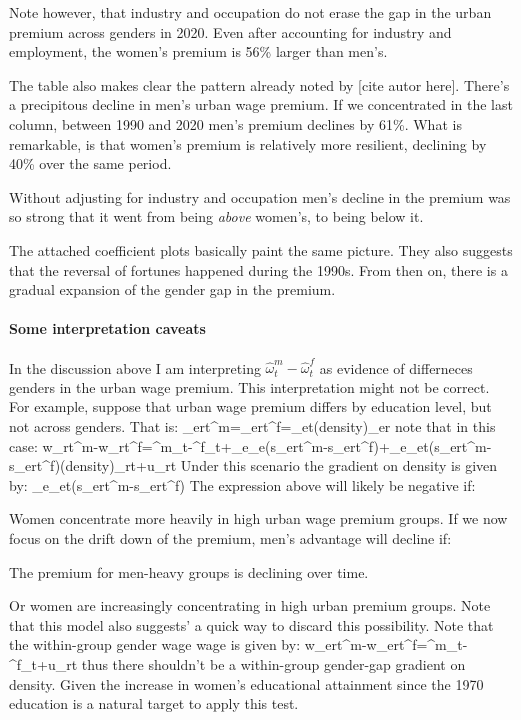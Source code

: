 	\item Note however, that industry and occupation do not erase the gap in the urban premium across genders in 2020. Even after accounting for industry and employment, the women's premium is 56\% larger than men's.
	\item The table also makes clear the pattern already noted by [cite autor here]. There's a precipitous decline in men's urban wage premium. If we concentrated in the last column, between 1990 and 2020 men's premium declines by 61\%. What is remarkable, is that women's premium is relatively more resilient, declining by 40\% over the same period.
	\item Without adjusting for industry and occupation men's decline in the premium was so strong that it went from being \textit{above} women's, to being below it.
\eitem 

The attached coefficient plots basically paint the same picture. They also suggests that the reversal of fortunes happened during the 1990s. From then on, there is a gradual expansion of the gender gap in the premium.





\paragraph{Some interpretation caveats}
\bitem
	\item In the discussion above I am interpreting  $\hat{\omega}^m_t-\hat{\omega}^f_t$ as evidence of differneces genders in the urban wage premium. This interpretation might not be correct. For example, suppose that urban wage premium differs by education level, but not across genders. That is:
	\beqns
		\gamma_{ert}^m=\gamma_{ert}^f=\omega_{et}\ln(density)_{er}
	\eeqns
	note that in this case:
	\beqns
		w_{rt}^m-w_{rt}^f=\alpha^m_t-\alpha^f_t+\sum_e\delta_e(s_{ert}^m-s_{ert}^f)+\sum_{e}\omega_{et}(s_{ert}^m-s_{ert}^f)\ln(density)_{rt}+u_{rt}
	\eeqns
	Under this scenario the gradient on density is given by:
	\beqns
		\sum_{e}\omega_{et}(s_{ert}^m-s_{ert}^f)
	\eeqns
	The expression above will likely be negative if:
	\bitem 
		\item Women concentrate more heavily in high urban wage premium groups.
	\eitem 
	If we now focus on the drift down of the premium, men's advantage will decline if:
	\bitem
		\item The premium for men-heavy groups is declining over time.
		\item Or women are increasingly concentrating in high urban premium groups.
	\eitem
	Note that this model also suggests' a quick way to discard this possibility. Note that the within-group gender wage wage is given by:
	\beqns
			w_{ert}^m-w_{ert}^f=\alpha^m_t-\alpha^f_t+u_{rt}
	\eeqns
	thus there shouldn't be a within-group gender-gap gradient on density. Given the increase in women's educational attainment since the 1970 education is a natural target to apply this test.
	

